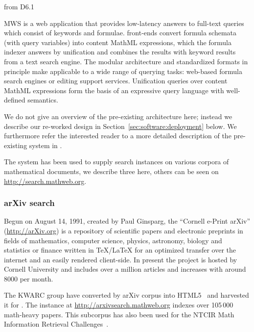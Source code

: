\begin{newpart}{from D6.1}

MWS is a web application that provides low-latency answers to full-text queries which consist of keywords and formulae.
\MWS front-ends convert formula schemata (with query variables) into content MathML expressions, which the \MWS formula indexer answers by unification and combines the results with keyword results from a text search engine.
The modular architecture and standardized formats in principle make \MWS applicable to a wide range of querying tasks:
web-based formula search engines or editing support services. 
Unification queries over content MathML expressions form the basis of an expressive query language with well-defined semantics.

We do not give an overview of the pre-existing \MWS architecture here; instead we describe our re-worked design in Section~\ref{sec:software:deployment} below. 
We furthermore refer the interested reader to a more detailed description of the pre-existing system in . 

The \MWS system has been used to supply search instances on various corpora of mathematical documents, we describe three here, others can be seen on \url{http://search.mathweb.org}. 

\subsubsection{arXiv search}

Begun on August 14, 1991, created by Paul Ginsparg, the ``Cornell e-Print arXiv''
(\url{http://arXiv.org}) is a repository of scientific papers and electronic preprints in
fields of mathematics, computer science, physics, astronomy, biology and statistics or
finance written in {\TeX/\LaTeX} for an optimized transfer over the internet and an easily
rendered client-side. In present the project is hosted by Cornell University and includes
over a million articles and increases with around 8000 per month.

The KWARC group have converted by arXiv corpus into HTML5~\cite{StaKoh:tlcspx10} and
harvested it for \MWS. The instance at \url{http://arxivsearch.mathweb.org}
indexes over 105\,000 math-heavy papers. This subcorpus has also been used for the NTCIR
Math Information Retrieval
Challenges~\cite{AizKohOun:nmpto13,AizKohOunSch:nmto14,AizKohOunSch:nmto16}.


\end{newpart}
